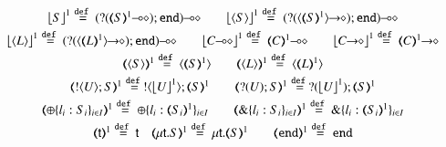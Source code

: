 \begin{figure}[h!]
\\
$
\begin{array}{c}
	\vtmap{{S}}{1} \defeq	\lhot{(\btinp{\lhot{\tmap{S}{1}}} \tinact)}
	\qquad
	\vtmap{\chtype{S}}{1} \defeq	\lhot{(\btinp{\shot{\chtype{\tmap{S}{1}}}} \tinact)}
	\\[1mm]

	\vtmap{\chtype{L}}{1} \defeq	\lhot{(\btinp{\shot{\chtype{\tmap{L}{1}}}} \tinact)}
	\qquad
	\vtmap{\lhot{C}}{1} \defeq \lhot{\tmap{C}{1}}
	\qquad
	\vtmap{\shot{C}}{1} \defeq \shot{\tmap{C}{1}}
	\\[1mm]

	\tmap{\chtype{S}}{1} \defeq	\chtype{\tmap{S}{1}} 
	\qquad
	\tmap{\chtype{L}}{1} \defeq	\chtype{\tmap{L}{1}}
	\\[1mm]

	\tmap{\btout{U} S}{1} \defeq \btout{{\vtmap{U}{1}}} \tmap{S}{1}
	\qquad
	\tmap{\btinp{U} S}{1} \defeq \btinp{{\vtmap{U}{1}}} \tmap{S}{1}
	\\[1mm]

	\tmap{\btsel{l_i: S_i}_{i \in I}}{1} \defeq \btsel{l_i: \tmap{S_i}{1}}_{i \in I}
	\qquad
	\tmap{\btbra{l_i: S_i}_{i \in I}}{1} \defeq \btbra{l_i: \tmap{S_i}{1}}_{i \in I}
	\\[1mm]

	\tmap{\vart{t}}{1} \defeq \vart{t} \quad \tmap{\trec{t}{S}}{1}  \defeq \trec{t}{\tmap{S}{1}}
	\qquad 
	\tmap{\tinact}{1}  \defeq  \tinact
	\\[1mm]
\end{array}
$


\end{figure}
